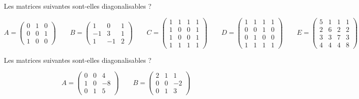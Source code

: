 \begin{corr}
\end{corr}

\begin{exos}[Exercice 10]
Les matrices suivantes sont-elles diagonalisables ?

\[A=\begin{pmatrix}
0 & 1 & 0 \\
0 & 0 & 1 \\
1 & 0 & 0
\end{pmatrix}\qquad B=\begin{pmatrix}
1 & 0 & 1 \\
-1 & 3 & 1 \\
1 & -1 & 2
\end{pmatrix}\qquad C=\begin{pmatrix}
1 & 1 & 1 & 1 \\
1 & 0 & 0 & 1 \\
1 & 0 & 0 & 1 \\
1 & 1 & 1 & 1
\end{pmatrix}\qquad D=\begin{pmatrix}
1 & 1 & 1 & 1 \\
0 & 0 & 1 & 0 \\
0 & 1 & 0 & 0 \\
1 & 1 & 1 & 1
\end{pmatrix}\qquad E=\begin{pmatrix}
5 & 1 & 1 & 1 \\
2 & 6 & 2 & 2 \\
3 & 3 & 7 & 3 \\
4 & 4 & 4 & 8
\end{pmatrix}\]
\end{exos}

\begin{corr}
\end{corr}

\begin{exos}[Exercice 11]
Les matrices suivantes sont-elles diagonalisables ?

\[A=\begin{pmatrix}
0 & 0 & 4 \\
1 & 0 & -8 \\
0 & 1 & 5
\end{pmatrix}\qquad B=\begin{pmatrix}
2 & 1 & 1 \\
0 & 0 & -2 \\
0 & 1 & 3
\end{pmatrix}\]
\end{exos}

